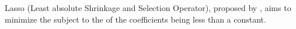 \documentclass[twoside]{article}
\begin{document}

Lasso (Least absolute Shrinkage and Selection Operator), proposed by \citet{tibshirani1996regression}, aims to minimize the  subject to the  of the coefficients being less than a constant.

\newpage


\end{document}
